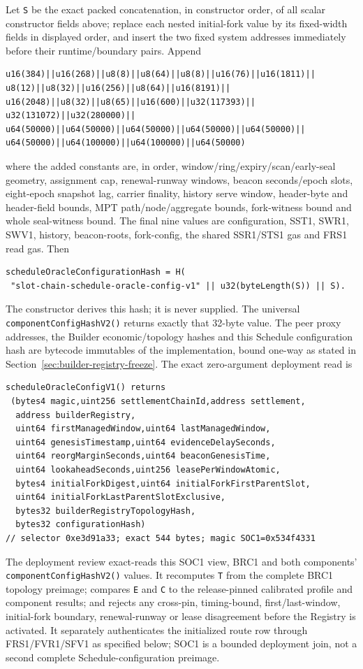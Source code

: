 \documentclass[a4paper,11pt]{article}
\newcommand{\code}[1]{\nolinkurl{#1}}
\begin{document}
Let \code{S} be the exact packed concatenation, in constructor order, of all
scalar constructor fields above; replace each nested initial-fork value by its
fixed-width fields in displayed order, and insert the two fixed system
addresses immediately before their runtime/boundary pairs.  Append
\begin{verbatim}
u16(384)||u16(268)||u8(8)||u8(64)||u8(8)||u16(76)||u16(1811)||
u8(12)||u8(32)||u16(256)||u8(64)||u16(8191)||
u16(2048)||u8(32)||u8(65)||u16(600)||u32(117393)||
u32(131072)||u32(280000)||
u64(50000)||u64(50000)||u64(50000)||u64(50000)||u64(50000)||
u64(50000)||u64(100000)||u64(100000)||u64(50000)
\end{verbatim}
where the added constants are, in order, window/ring/expiry/scan/early-seal
geometry, assignment cap, renewal-runway windows, beacon seconds/epoch slots,
eight-epoch snapshot lag, carrier finality, history serve window, header-byte
and header-field bounds, MPT path/node/aggregate bounds, fork-witness bound and
whole seal-witness bound.  The final nine values are configuration, SST1,
SWR1, SWV1, history, beacon-roots, fork-config, the shared SSR1/STS1 gas and
FRS1 read gas.
Then
\begin{verbatim}
scheduleOracleConfigurationHash = H(
 "slot-chain-schedule-oracle-config-v1" || u32(byteLength(S)) || S).
\end{verbatim}
The constructor derives this hash; it is never supplied.  The universal
\code{componentConfigHashV2()} returns exactly that 32-byte value.  The peer
proxy addresses, the Builder economic/topology hashes and this Schedule
configuration hash are bytecode immutables of the implementation, bound
one-way as stated in Section~\ref{sec:builder-registry-freeze}.  The exact
zero-argument deployment read is
\begin{verbatim}
scheduleOracleConfigV1() returns
 (bytes4 magic,uint256 settlementChainId,address settlement,
  address builderRegistry,
  uint64 firstManagedWindow,uint64 lastManagedWindow,
  uint64 genesisTimestamp,uint64 evidenceDelaySeconds,
  uint64 reorgMarginSeconds,uint64 beaconGenesisTime,
  uint64 lookaheadSeconds,uint256 leasePerWindowAtomic,
  bytes4 initialForkDigest,uint64 initialForkFirstParentSlot,
  uint64 initialForkLastParentSlotExclusive,
  bytes32 builderRegistryTopologyHash,
  bytes32 configurationHash)
// selector 0xe3d91a33; exact 544 bytes; magic SOC1=0x534f4331
\end{verbatim}
The deployment review exact-reads this SOC1 view, BRC1 and both components'
\code{componentConfigHashV2()} values.  It recomputes \code{T} from the
complete BRC1 topology preimage; compares \code{E} and \code{C} to the
release-pinned calibrated profile and component results; and rejects any
cross-pin, timing-bound, first/last-window, initial-fork boundary,
renewal-runway or lease disagreement before the Registry is activated.  It
separately authenticates the initialized route row through FRS1/FVR1/SFV1 as
specified below; SOC1 is a bounded deployment join, not a second complete
Schedule-configuration preimage.
\end{document}
